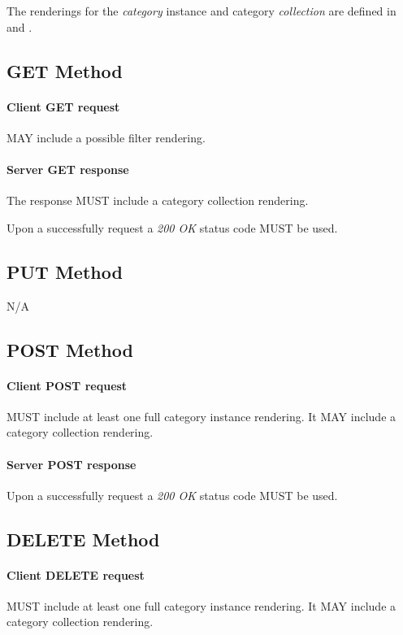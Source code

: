 \documentclass[10pt,a4paper]{article}
\begin{document}
The renderings for the {\em category} instance and category {\em collection} are defined in \cite{occi:text} and \cite{occi:json}.

\subsection{GET Method}

\paragraph{Client GET request}
MAY include a possible filter rendering.

\paragraph{Server GET response}
The response MUST include a category collection rendering.

Upon a successfully request a \emph{200 OK} status code MUST be used.

\subsection{PUT Method}

N/A

\subsection{POST Method}

\paragraph{Client POST request}
MUST include at least one full category instance rendering. It MAY include a category collection rendering.

\paragraph{Server POST response}
Upon a successfully request a \emph{200 OK} status code MUST be used.

\subsection{DELETE Method}

\paragraph{Client DELETE request}
MUST include at least one full category instance rendering. It MAY include a category collection rendering.
\end{document}
